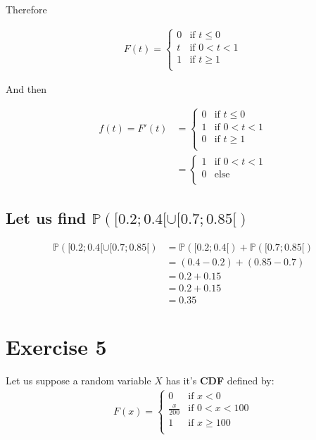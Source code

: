 \documentclass[11pt]{article}
\def\lt{<}
\begin{document}
    
  Therefore
  
  \begin{align*}
F(t) = \begin{cases}
            0 & \text{if } t \le 0\\
            t & \text{if } 0 \lt t \lt 1\\
            1 & \text{if } t \geq 1\\
        \end{cases}
\end{align*}
    
And then 

  \begin{align*}
f(t)=F'(t) &= \begin{cases}
            0 & \text{if } t \le 0\\
            1 & \text{if } 0 \lt t \lt 1\\
            0 & \text{if } t \geq 1\\
        \end{cases}\\
        &=\begin{cases}
        1 & \text{if } 0 \lt t \lt 1\\
            0 & \text{else }\\
        \end{cases}
\end{align*} 
    
\subsection{Let us find $\mathbb{P}([0.2 ;0.4[\cup [0.7;0.85[)$}

\begin{align*}
\mathbb{P}([0.2 ;0.4[\cup [0.7;0.85[)
       &=\mathbb{P}([0.2 ;0.4[)+\mathbb{P}([0.7;0.85[)\\
       &=(0.4-0.2)+(0.85-0.7)\\
       &=0.2+0.15\\
       &=0.2+0.15\\
       &=0.35
\end{align*}
   
\newpage 
    \section{Exercise 5}
    
    Let us suppose a random variable $X$ has it's \textbf{CDF} defined by: 
\begin{align*}
F(x) = \begin{cases}
            0 & \text{if } x \lt 0\\
            \frac{x}{200} & \text{if } 0 \lt x \lt 100\\
            1 & \text{if } x \geq 100\\
        \end{cases}
\end{align*}
\end{document}
